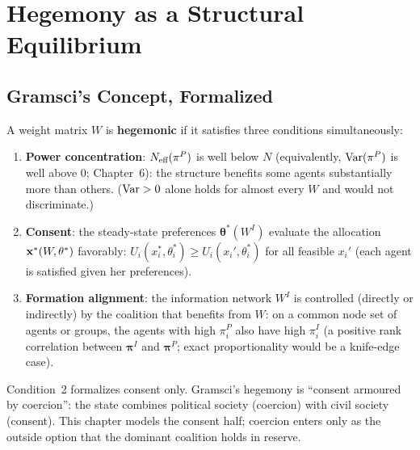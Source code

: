 \documentclass[../structural_economics_book.tex]{subfiles}
\begin{document}
\section{Hegemony as a Structural Equilibrium}
\label{ch24:sec:hegemony}

\subsection{Gramsci's Concept, Formalized}

\begin{definition}[Hegemony]\label{ch24:def:hegemony}
A weight matrix $W$ is \textbf{hegemonic} if it satisfies three conditions simultaneously:
\begin{enumerate}
\item \textbf{Power concentration}: $N_{\text{eff}}(\pi^P)$ is well below $N$ (equivalently, $\operatorname{Var}(\pi^P)$ is well above 0; Chapter~6): the structure benefits some agents substantially more than others. ($\operatorname{Var} > 0$ alone holds for almost every $W$ and would not discriminate.)
\item \textbf{Consent}: the steady-state preferences $\boldsymbol{\theta}^*(W^I)$ evaluate the allocation $\mathbf{x}^*(W, \theta^*)$ favorably: $U_i(x_i^*, \theta_i^*) \geq U_i(x_i', \theta_i^*)$ for all feasible $x_i'$ (each agent is satisfied given her preferences).
\item \textbf{Formation alignment}: the information network $W^I$ is controlled (directly or indirectly) by the coalition that benefits from $W$: on a common node set of agents or groups, the agents with high $\pi^P_i$ also have high $\pi^I_i$ (a positive rank correlation between $\boldsymbol{\pi}^I$ and $\boldsymbol{\pi}^P$; exact proportionality would be a knife-edge case).
\end{enumerate}
Condition~2 formalizes consent only. Gramsci's hegemony is ``consent armoured by coercion'': the state combines political society (coercion) with civil society (consent). This chapter models the consent half; coercion enters only as the outside option that the dominant coalition holds in reserve.
\end{definition}
\end{document}

